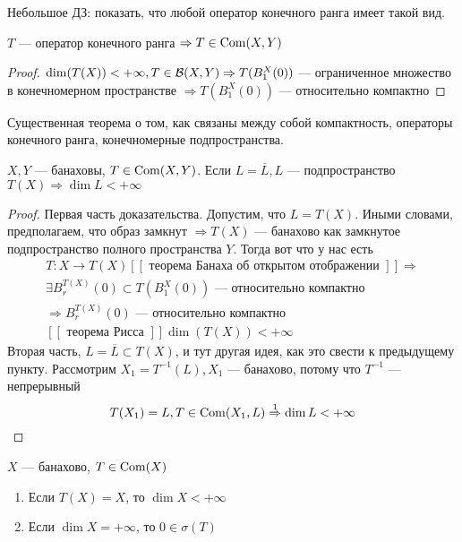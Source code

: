\documentclass[document]{subfiles}
\begin{document}
Небольшое  ДЗ: показать, что любой оператор конечного ранга имеет такой вид.

\begin{statement}
    $T$ --- оператор конечного ранга $\Rightarrow T \in \operatorname{Com}(X, Y)$
\end{statement}

\begin{proof}
    $\dim(T(X)) < +\infty, T \in \mathcal{B}(X,Y) \Rightarrow T(B^X_1(0))$ --- ограниченное множество в конечномерном пространстве
     $\Rightarrow T(B^X_1(0))$ --- относительно компактно
\end{proof}

Существенная теорема о том, как связаны между собой компактность, операторы конечного ранга, конечномерные подпространства.

\begin{theorem}
    $X,Y$ --- банаховы, $T \in \operatorname{Com}(X,Y)$. Если $L = \overline{L}, L$ --- подпространство $T(X) \Rightarrow \dim L < +\infty$
\end{theorem}

\begin{proof}
    Первая часть доказательства. Допустим, что $L = T(X)$. Иными словами, предполагаем, что образ замкнут $\Rightarrow T(X)$ --- банахово как замкнутое подпространство полного пространства $Y$. Тогда вот что у нас есть
    \begin{gather*}
        T: X \rightarrow T(X) [[\text{ теорема Банаха об открытом отображении }]] \Rightarrow \\
        \exists B_r^{T(X)}(0) \subset T(B^X_1(0)) \text{ --- относительно компактно} \\
        \Rightarrow B_r^{T(X)}(0) \text{ --- относительно компактно} \\
        [[\text{ теорема Рисса }]] \dim(T(X)) < +\infty
    \end{gather*}
    Вторая часть, $L = \overline{L} \subset T(X)$, и тут другая идея, как это свести к предыдущему пункту. Рассмотрим $X_1 = T^{-1}(L), X_1$ --- банахово, потому что $T^{-1}$ --- непрерывный
    \[ T(X_1) = L, T \in \operatorname{Com}(X_1, L) \stackrel{1}{\Rightarrow} \dim L < +\infty \]
\end{proof}

\begin{corollary}
    $X$ --- банахово, $T \in \operatorname{Com}(X)$
    \begin{enumerate}
        \item Если $T(X) = X$, то $\dim X < +\infty$ 
        \item Если $\dim X = +\infty$, то $0 \in \sigma(T)$
    \end{enumerate}
\end{corollary}
\end{document}
